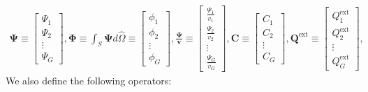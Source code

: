 \begin{gather}
  \bm{\Psi} \equiv
  \begin{bmatrix}
    \Psi_1 \\
    \Psi_2 \\
    \vdots \\
    \Psi_G
  \end{bmatrix},
  \bm{\Phi} \equiv \int_S \bm{\Psi}d\hat{\Omega} \equiv
  \begin{bmatrix}
    \phi_1 \\
    \phi_2 \\
    \vdots \\
    \phi_G
  \end{bmatrix},
  \bm{\frac{\Psi}{v}} \equiv
  \begin{bmatrix}
    \frac{\Psi_1}{v_1} \\
    \frac{\Psi_2}{v_2} \\
    \vdots \\
    \frac{\Psi_G}{v_G}
  \end{bmatrix},
  \bm{C} \equiv
  \begin{bmatrix}
    C_1 \\
    C_2 \\
    \vdots \\
    C_G
  \end{bmatrix},
  \bm{Q}^{\text{ext}} \equiv
  \begin{bmatrix}
    Q^\text{ext}_1 \\
    Q^\text{ext}_2 \\
    \vdots \\
    Q^\text{ext}_G
  \end{bmatrix}, \nonumber
\end{gather}
%
We also define the following operators:
%
